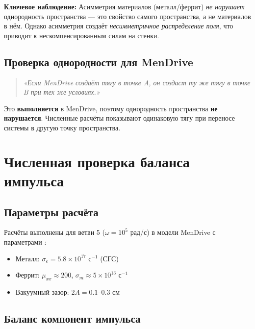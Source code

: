 \documentclass[a4paper,12pt]{article}
\begin{document}
\textbf{Ключевое наблюдение:} Асимметрия материалов (металл/феррит)
\textit{не нарушает} однородность пространства --- это свойство самого
пространства, а не материалов в нём. Однако асимметрия создаёт
\textit{несимметричное распределение поля}, что приводит к
нескомпенсированным силам на стенки.

\subsection{Проверка однородности для MenDrive}

\begin{quote}
\textit{«Если MenDrive создаёт тягу в точке A, он создаст ту же тягу
в точке B при тех же условиях.»}
\end{quote}

Это \textbf{выполняется} в MenDrive, поэтому однородность пространства
\textbf{не нарушается}. Численные расчёты показывают одинаковую тягу
при переносе системы в другую точку пространства.

\section{Численная проверка баланса импульса}

\subsection{Параметры расчёта}

Расчёты выполнены для ветви 5 ($\omega = 10^5$ рад/с) в модели MenDrive
с параметрами \cite{MenDriveReal}:
\begin{itemize}
    \item Металл: $\sigma_e = 5.8 \times 10^{17}$ с$^{-1}$ (СГС)
    \item Феррит: $\mu_{xx} \approx 200$, $\sigma_m \approx 5 \times 10^{13}$ с$^{-1}$
    \item Вакуумный зазор: $2A = 0.1$--$0.3$ см
\end{itemize}

\subsection{Баланс компонент импульса}
\end{document}
